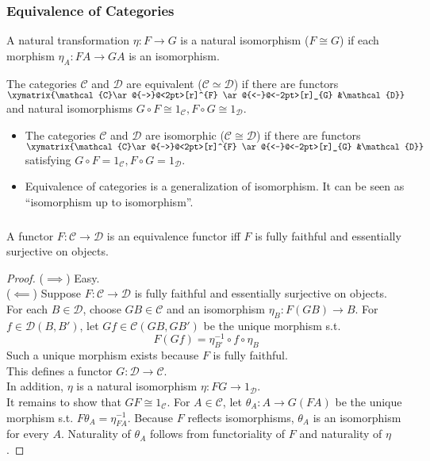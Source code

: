 \documentclass[UTF8,aspectratio=43,11pt,colorlinks,compress,openany]{beamer}%
\begin{document}
\begin{frame}\frametitle{Equivalence of Categories}
\begin{definition}
A natural transformation $\eta: F\to G$ is a natural isomorphism ($F\cong G$) if each morphism $\eta_A: FA\to GA$ is an isomorphism.
\end{definition}
\begin{definition}
The categories $\mathcal{C}$ and $\mathcal{D}$ are equivalent ($\mathcal{C}\simeq\mathcal{D}$) if there are functors $\xymatrix{\mathcal{C}\ar@{->}@<2pt>[r]^{F} \ar@{<-}@<-2pt>[r]_{G} &\mathcal{D}}$ and natural isomorphisms $G\circ F\cong 1_{\mathcal{C}}, F\circ G\cong 1_{\mathcal{D}}$.
\end{definition}
\begin{itemize}
	\item The categories $\mathcal{C}$ and $\mathcal{D}$ are isomorphic ($\mathcal{C}\cong\mathcal{D}$) if there are functors $\xymatrix{\mathcal{C}\ar@{->}@<2pt>[r]^{F} \ar@{<-}@<-2pt>[r]_{G} &\mathcal{D}}$ satisfying $G\circ F=1_{\mathcal{C}}, F\circ G=1_{\mathcal{D}}$.
	\item Equivalence of categories is a generalization of isomorphism. It can be seen as ``isomorphism up to isomorphism''.
\end{itemize}
\end{frame}

\begin{frame}\frametitle{}
\begin{theorem}
A functor $F:\mathcal{C}\to\mathcal{D}$ is an equivalence functor iff $F$ is fully faithful and essentially surjective on objects.
\end{theorem}
\begin{proof}
($\implies$) Easy.\\
($\impliedby$) Suppose $F:\mathcal{C}\to\mathcal{D}$ is fully faithful and essentially surjective on objects. For each $B\in\mathcal{D}$, choose $GB\in\mathcal{C}$ and an isomorphism $\eta_B: F(GB)\to B$. For $f\in\mathcal{D}(B,B')$, let $Gf\in\mathcal{C}(GB,GB')$ be the unique morphism s.t.
\[F(Gf)=\eta_{B'}^{-1}\circ f\circ\eta_B\]
Such a unique morphism exists because $F$ is fully faithful.\\
This defines a functor $G:\mathcal{D}\to\mathcal{C}$.\\
In addition, $\eta$ is a natural isomorphism $\eta: FG\to 1_\mathcal{D}$.\\
It remains to show that $GF\cong 1_\mathcal{C}$. For $A\in\mathcal{C}$, let $\theta_A: A\to G(FA)$ be the unique morphism s.t. $F\theta_A=\eta_{FA}^{-1}$. Because $F$ reflects isomorphisms, $\theta_A$ is an isomorphism for every $A$. Naturality of $\theta_A$ follows from functoriality of $F$ and naturality of $\eta$.
\end{proof}
\end{frame}
\end{document}
